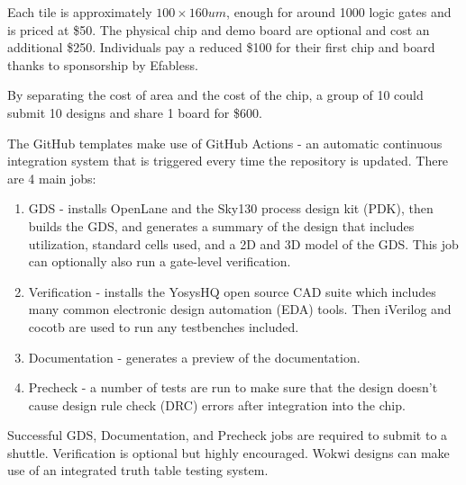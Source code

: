 Each tile is approximately $100\times 160 um$, enough for around 1000 logic gates and is priced at \$50.
The physical chip and demo board are optional and cost an additional \$250.
Individuals pay a reduced \$100 for their first chip and board thanks to sponsorship by Efabless\cite{efabless}.

By separating the cost of area and the cost of the chip, a group of 10 could submit 10 designs and share 1 board for \$600.

The GitHub templates\cite{verilogtemplate} make use of GitHub Actions\cite{githubactions} - an automatic continuous integration system that is triggered every time the repository is updated.
There are 4 main jobs:

\begin{enumerate}
	\item GDS - installs OpenLane and the Sky130 process design kit (PDK), then builds the GDS, and generates a summary of the design that includes utilization, standard cells used, and a 2D and 3D model of the GDS.
This job can optionally also run a gate-level verification.
	\item Verification - installs the YosysHQ open source CAD suite which includes many common electronic design automation (EDA) tools.
Then iVerilog and cocotb are used to run any testbenches included.
	\item Documentation - generates a preview of the documentation.
	\item Precheck - a number of tests are run to make sure that the design doesn’t cause design rule check (DRC) errors after integration into the chip.
\end{enumerate}

Successful GDS, Documentation, and Precheck jobs are required to submit to a shuttle.
Verification is optional but highly encouraged. Wokwi designs can make use of an integrated truth table testing system\cite{automatedtesting}.

